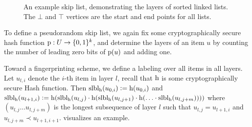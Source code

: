 \begin{figure*}
\begin{scaletikzpicturetowidth}{\textwidth}
\end{scaletikzpicturetowidth}

\caption{
An example skip list, demonstrating the layers of sorted linked lists. The $\bot$ and $\top$ vertices are the start and end points for all lists.
}

\label{fig:skip-list-example}
\end{figure*}

To define a pseudorandom skip list, we again fix some cryptographically secure hash function ${\operatorname{p}}: {U} \rightarrow {\{0, 1\}^k}$, and determine the layers of an item $u$ by counting the number of leading zero bits of $\operatorname{p}(u)$ and adding one.

Toward a fingerprinting scheme, we define a labeling over all items in all layers. Let $u_{l, i}$ denote the $i$-th item in layer $l$, recall that $\operatorname{h}$ is some cryptographically secure Hash function.
Then $\operatorname{slbl_{\operatorname{h}}}(u_{0, i}) \vcentcolon= \operatorname{h}(u_{0, i})$ and $\operatorname{slbl_{\operatorname{h}}}(u_{l + 1, i}) \vcentcolon= \operatorname{h}(\operatorname{slbl_{\operatorname{h}}}(u_{l, j}) \cdot \operatorname{h}( \operatorname{slbl_{\operatorname{h}}}(u_{l, j + 1}) \cdot \operatorname{h}(\ldots \cdot \operatorname{slbl_{\operatorname{h}}}(u_{l, j + m}))))$ where $(u_{l, j} \ldots u_{l, j + m})$ is the longest subsequence of layer $l$ such that $u_{l, j} = u_{l + 1, i}$ and $u_{l, j + m} \prec u_{l + 1, i + 1}$.  visualizes an example.

